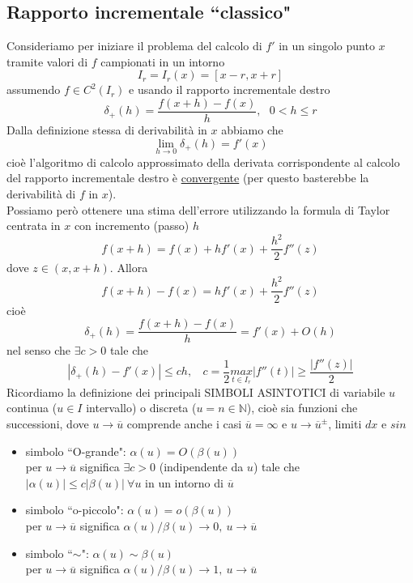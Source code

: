 \documentclass[12pt,a4paper]{article}
\begin{document}
\subsection{Rapporto incrementale ``classico"}
Consideriamo per iniziare il problema del calcolo di $f'$ in un singolo punto $x$ tramite valori di $f$ campionati in un intorno 
\begin{equation*}
    I_r=I_r(x)=[x-r,x+r]
\end{equation*}
assumendo $f\in C^2(I_r)$ e usando
il rapporto incrementale destro 
\begin{equation*}
    \delta_+(h)=\frac{f(x+h)-f(x)}{h},\  \  \  0<h\leq r
\end{equation*}
Dalla definizione stessa di derivabilità in $x$ abbiamo che
\begin{equation*}
    \underset{h\rightarrow0}{\lim}\delta_+(h)=f'(x)
\end{equation*}
cioè l'algoritmo di calcolo approssimato della derivata corrispondente al calcolo del rapporto incrementale destro è \uline{convergente} (per questo basterebbe la derivabilità di $f$ in $x$).\\Possiamo però ottenere una stima dell'errore utilizzando la formula di Taylor centrata in $x$ con incremento (passo) $h$
\begin{equation*}
    f(x+h)=f(x)+hf'(x)+\frac{h^2}{2}f''(z)
\end{equation*}
dove $z\in (x,x+h)$. Allora
\begin{equation*}
    f(x+h)-f(x)=hf'(x)+\frac{h^2}{2}f''(z)
\end{equation*}
cioè
\begin{equation*}
    \delta_+(h)=\frac{f(x+h)-f(x)}{h}=f'(x)+O(h)
\end{equation*}
nel senso che $\exists c>0$ tale che 
\begin{equation*}
    |\delta_+(h)-f'(x)|\leq ch,\  \  \  \  c=\frac{1}{2}\underset{t\in I_r}{max}|f''(t)|\geq\frac{|f''(z)|}{2}
\end{equation*}
Ricordiamo la definizione dei principali SIMBOLI ASINTOTICI di variabile $u$ continua ($u\in I$ intervallo) o discreta ($u = n \in \mathbb{N}$), cioè sia funzioni che successioni, dove $u \rightarrow \overline{u}$ comprende anche i casi $\overline{u}=\infty$ e $u \rightarrow \overline{u}^{\pm}$, limiti $dx$ e $sin$
\begin{itemize}
    \item simbolo ``O-grande": $\alpha(u)=O(\beta(u))$ \\
    per $u \rightarrow \overline{u}$ significa $\exists c > 0$ (indipendente da $u$) tale che $|\alpha(u)| \leq c|\beta(u)| \ \forall u$ in un intorno di $\overline{u}$ 
    \item simbolo ``o-piccolo": $\alpha(u)=o(\beta(u))$ \\
    per $u \rightarrow \overline{u}$ significa $\alpha(u) / \beta(u) \rightarrow 0, \ u \rightarrow \overline{u}$
    \item simbolo ``$\sim$": $\alpha(u)\sim\beta(u)$ \\
    per $u \rightarrow \overline{u}$ significa $\alpha(u) / \beta(u) \rightarrow 1, \ u \rightarrow \overline{u}$
\end{itemize}
\end{document}
